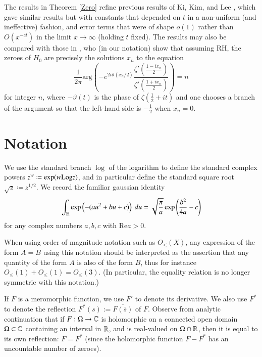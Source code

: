 The results in Theorem \ref{Zero} refine previous results of Ki, Kim, and Lee \cite[Theorems 1.3, 1.4]{kkl}, which gave similar results but with constants that depended on $t$ in a non-uniform (and ineffective) fashion, and error terms that were of shape $o(1)$ rather than $O(x^{-ct})$ in the limit $x \to \infty$ (holding $t$ fixed).  The results may also be compared with those in \cite{arias-lune}, who (in our notation) show that assuming RH, the zeroes of $H_0$ are precisely the solutions $x_n$ to the equation
$$ \frac{1}{2\pi} \mathrm{arg}\left( - e^{2 i \vartheta(x_n/2)} \frac{\zeta'(\frac{1-ix_n}{2})}{\zeta'(\frac{1+ix_n}{2})}\right) = n $$
for integer $n$, where $-\vartheta(t)$ is the phase of $\zeta(\frac{1}{2}+it)$ and one chooses a branch of the argument so that the left-hand side is $-\frac{1}{2}$ when $x_n=0$.



\section{Notation}

We use the standard branch $\log$ of the logarithm to define the standard complex powers $z^w \coloneqq \exp( w {\operatorname{Log}} z)$, and in particular define the standard square root $\sqrt{z} \coloneqq z^{1/2}$.  We record the familiar gaussian identity
\begin{equation}\label{gaussian}
 \int_{\mathbb{R}} \exp\left(-(au^2+bu+c)\right)\ du = \sqrt{\frac{\pi}{a}} \exp\left( \frac{b^2}{4a} - c\right)
\end{equation}
for any complex numbers $a,b,c$ with $\mathrm{Re} a > 0$.

When using order of magnitude notation such as $O_{\leq}(X)$, any expression of the form $A=B$ using this notation should be interpreted as the assertion that any quantity of the form $A$ is also of the form $B$, thus for instance $O_{\leq}(1) + O_{\leq}(1) = O_{\leq}(3)$.  (In particular, the equality relation is no longer symmetric with this notation.)

If $F$ is a meromorphic function, we use $F'$ to denote its derivative.  We also use $F^*$ to denote the reflection $F^*(s) := \overline{F(\overline{s})}$ of $F$.  Observe from analytic continuation that if $F:\Omega \to \mathbb{C}$ is holomorphic on a connected open domain $\Omega \subset \mathbb{C}$ containing an interval in $\mathbb{R}$, and is real-valued on $\Omega \cap \mathbb{R}$, then it is equal to its own reflection: $F = F^*$ (since the holomorphic function $F - F^*$ has an uncountable number of zeroes).

